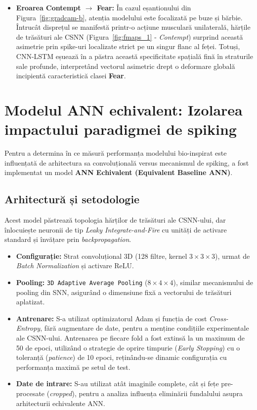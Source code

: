 \begin{itemize}
	\item \textbf{Eroarea Contempt $\to$ Fear:} În cazul eșantionului din Figura~\ref{fig:gradcam-b}, atenția modelului este focalizată pe buze și bărbie. Întrucât disprețul se manifestă printr-o acțiune musculară unilaterală, hărțile de trăsături ale CSNN (Figura~\ref{fig:fmaps_1} - \textit{Contempt}) surprind această asimetrie prin spike-uri localizate strict pe un singur flanc al feței. Totuși, CNN-LSTM eșuează în a păstra această specificitate spațială fină în straturile sale profunde, interpretând vectorul asimetric drept o deformare globală incipientă caracteristică clasei \textbf{Fear}.
\end{itemize}

\section{Modelul ANN echivalent: Izolarea impactului paradigmei de spiking}

Pentru a determina în ce măsură performanța modelului bio-inspirat este influențată de arhitectura sa convoluțională versus mecanismul de spiking, a fost implementat un model \textbf{ANN Echivalent (Equivalent Baseline ANN)}. 

\subsection*{Arhitectură și setodologie}
Acest model păstrează topologia hărților de trăsături ale CSNN-ului, dar înlocuiește neuronii de tip \textit{Leaky Integrate-and-Fire} cu unități de activare standard și învățare prin \textit{backpropagation}.

\begin{itemize}[noitemsep]
	\item \textbf{Configurație:} Strat convoluțional 3D (128 filtre, kernel $3 \times 3 \times 3$), urmat de \textit{Batch Normalization} și activare ReLU.
	\item \textbf{Pooling:} \texttt{3D Adaptive Average Pooling} ($8 \times 4 \times 4$), similar mecanismului de pooling din SNN, asigurând o dimensiune fixă a vectorului de trăsături aplatizat.
	\item \textbf{Antrenare:} S-a utilizat optimizatorul Adam și funcția de cost \textit{Cross-Entropy}, fără augmentare de date, pentru a menține condițiile experimentale ale CSNN-ului. Antrenarea pe fiecare fold a fost extinsă la un maximum de 50 de epoci, utilizând o strategie de oprire timpurie (\textit{Early Stopping}) cu o toleranță (\textit{patience}) de 10 epoci, reținându-se dinamic configurația cu performanța maximă pe setul de test.
	\item \textbf{Date de intrare:} S-au utilizat atât imaginile complete, cât și fețe pre-procesate (\textit{cropped}), pentru a analiza influența  eliminării fundalului asupra arhitecturii echivalente ANN.
\end{itemize}

